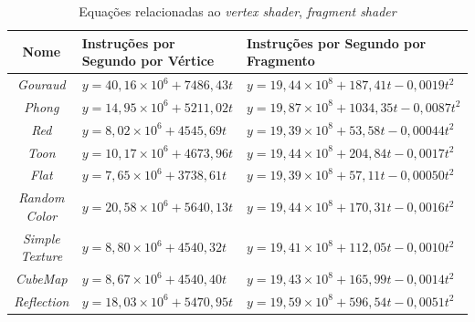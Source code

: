 	\begin{table}[ht]
	\centering	
	\begin{tabularx}{0.9\textwidth}{cXX}
		\toprule
		\textbf{Nome} & \textbf{Instruções por Segundo por Vértice} & \textbf{Instruções por Segundo por Fragmento}  \\
		\midrule
		\textit{Gouraud} & $y = 40,16 \times 10^6 + 7486,43t$ & $y = 19,44 \times 10 ^8 + 187,41t - 0,0019t^2$  \\
		\textit{Phong} &  $y = 14,95 \times 10^6 + 5211,02t$ & $y = 19,87 \times 10^8 + 1034,35t - 0,0087t^2$ \\
		\textit{Red} & $y = 8,02 \times 10^6 + 4545,69t$ & $y = 19,39 \times 10 ^8 + 53,58t - 0,00044t^2$\\
		\textit{Toon} & $y = 10,17 \times 10^6 + 4673,96t$ & $y = 19,44 \times 10 ^8 + 204,84t - 0,0017t^2$\\
		\textit{Flat} & $y = 7,65 \times 10^6 + 3738,61t$ & $y = 19,39 \times 10 ^8 + 57,11t - 0,00050t^2$ \\
		\textit{Random Color} & $y = 20,58 \times 10^6 + 5640,13t$ & $y = 19,44 \times 10 ^8 + 170,31t - 0,0016t^2$\\
		\textit{Simple Texture} & $y = 8,80 \times 10^6 + 4540,32t$ & $y = 19,41 \times 10 ^8 + 112,05t - 0,0010t^2$\\
		\textit{CubeMap} & $y = 8,67 \times 10^6 + 4540,40t$ & $y = 19,43 \times 10 ^8 + 165,99t - 0,0014t^2$ \\
		\textit{Reflection} & $y = 18,03 \times 10^6 + 5470,95t$ & $y = 19,59 \times 10 ^8 + 596,54t - 0,0051t^2$ \\
	
		\bottomrule
	\end{tabularx}
	\caption{Equações relacionadas ao \textit{vertex shader}, \textit{fragment shader}}
	\label{equacoes}
	\end{table}

